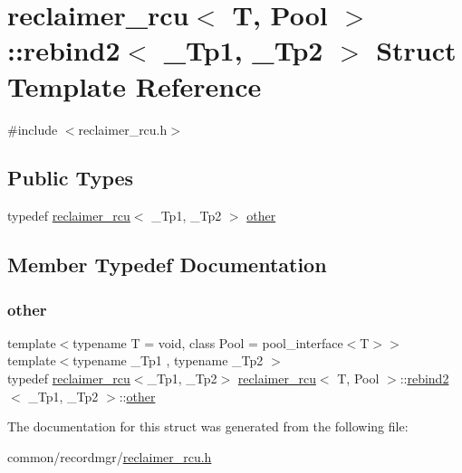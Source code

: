 \hypertarget{structreclaimer__rcu_1_1rebind2}{}\section{reclaimer\+\_\+rcu$<$ T, Pool $>$\+:\+:rebind2$<$ \+\_\+\+Tp1, \+\_\+\+Tp2 $>$ Struct Template Reference}
\label{structreclaimer__rcu_1_1rebind2}


{\ttfamily \#include $<$reclaimer\+\_\+rcu.\+h$>$}

\subsection*{Public Types}
\begin{DoxyCompactItemize}
\item 
typedef \hyperlink{classreclaimer__rcu}{reclaimer\+\_\+rcu}$<$ \+\_\+\+Tp1, \+\_\+\+Tp2 $>$ \hyperlink{structreclaimer__rcu_1_1rebind2_ad433aab5859e3812d45ab9cdea506af9}{other}
\end{DoxyCompactItemize}


\subsection{Member Typedef Documentation}
\mbox{\label{structreclaimer__rcu_1_1rebind2_ad433aab5859e3812d45ab9cdea506af9}} 
\subsubsection{\texorpdfstring{other}{other}}
{\footnotesize\ttfamily template$<$typename T  = void, class Pool  = pool\+\_\+interface$<$\+T$>$$>$ \\
template$<$typename \+\_\+\+Tp1 , typename \+\_\+\+Tp2 $>$ \\
typedef \hyperlink{classreclaimer__rcu}{reclaimer\+\_\+rcu}$<$\+\_\+\+Tp1, \+\_\+\+Tp2$>$ \hyperlink{classreclaimer__rcu}{reclaimer\+\_\+rcu}$<$ T, Pool $>$\+::\hyperlink{structreclaimer__rcu_1_1rebind2}{rebind2}$<$ \+\_\+\+Tp1, \+\_\+\+Tp2 $>$\+::\hyperlink{structreclaimer__rcu_1_1rebind2_ad433aab5859e3812d45ab9cdea506af9}{other}}



The documentation for this struct was generated from the following file\+:\begin{DoxyCompactItemize}
\item 
common/recordmgr/\hyperlink{reclaimer__rcu_8h}{reclaimer\+\_\+rcu.\+h}\end{DoxyCompactItemize}
